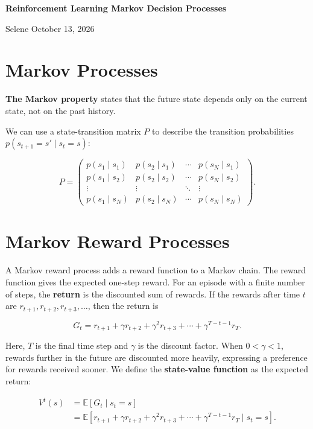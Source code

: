 \documentclass[a4paper,10pt]{article}
\begin{document}
\normalsize
\begin{center}
  {\Large\bfseries Reinforcement Learning \textbar{} Markov Decision Processes\par}
  \vspace{0.5em}
  Selene \quad\textperiodcentered\quad October 13, 2026
\end{center}
\vspace{0.7em}

\section{Markov Processes}

\textbf{The Markov property} states that the future state depends only on the current state, not on the past history.

We can use a state-transition matrix \(P\) to describe the transition probabilities \(p(s_{t+1}=s'\mid s_t=s)\):

\[
P=
\begin{pmatrix}
p(s_1\mid s_1) & p(s_2\mid s_1) & \cdots & p(s_N\mid s_1) \\
p(s_1\mid s_2) & p(s_2\mid s_2) & \cdots & p(s_N\mid s_2) \\
\vdots & \vdots & \ddots & \vdots \\
p(s_1\mid s_N) & p(s_2\mid s_N) & \cdots & p(s_N\mid s_N)
\end{pmatrix}.
\]

\section{Markov Reward Processes}

A Markov reward process adds a reward function to a Markov chain. The reward function gives the expected one-step reward. For an episode with a finite number of steps, the \textbf{return} is the discounted sum of rewards. If the rewards after time \(t\) are \(r_{t+1},r_{t+2},r_{t+3},\ldots\), then the return is

\[
G_t=r_{t+1}+\gamma r_{t+2}+\gamma^2r_{t+3}+\cdots+\gamma^{T-t-1}r_T.
\]

Here, \(T\) is the final time step and \(\gamma\) is the discount factor. When \(0<\gamma<1\), rewards further in the future are discounted more heavily, expressing a preference for rewards received sooner. We define the \textbf{state-value function} as the expected return:

\[
\begin{aligned}
V^t(s)
&=\mathbb{E}[G_t\mid s_t=s] \\
&=\mathbb{E}\left[r_{t+1}+\gamma r_{t+2}+\gamma^2r_{t+3}+\cdots+\gamma^{T-t-1}r_T\mid s_t=s\right].
\end{aligned}
\]
\end{document}
